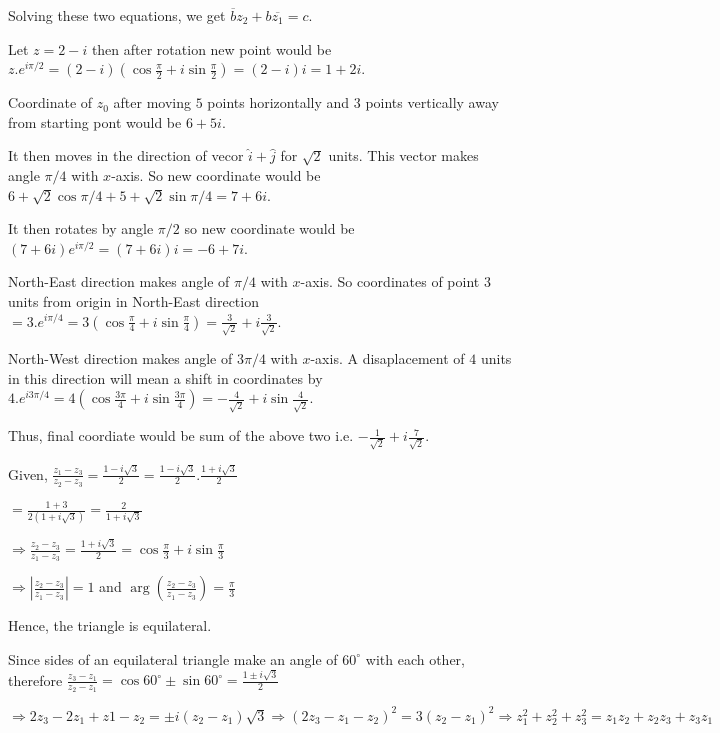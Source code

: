   Solving these two equations, we get $\overline{b}z_2 + b\overline{z_1} = c$.
\item   Let $z = 2 - i$ then after rotation new point would be $z.e^{i\pi/2} = (2 - i)\left(\cos\frac{\pi}{2} +
  i\sin\frac{\pi}{2}\right) = (2 - i)i = 1 + 2i$.
\item Coordinate of $z_0$ after moving $5$ points horizontally and $3$ points vertically away from starting pont would be
  $6 + 5i$.

  It then moves in the direction of vecor $\hat{i} + \hat{j}$ for $\sqrt{2}$ units. This vector makes angle $\pi/4$ with
  $x$-axis. So new coordinate would be $6 + \sqrt{2}\cos\pi/4 + 5 + \sqrt{2}\sin\pi/4 = 7 + 6i$.

  It then rotates by angle $\pi/2$ so new coordinate would be $(7 + 6i)e^{i\pi/2} = (7 + 6i)i = -6 + 7i$.
\item North-East direction makes angle of $\pi/4$ with $x$-axis. So coordinates of point $3$ units from origin in
  North-East direction $= 3.e^{i\pi/4} = 3\left(\cos\frac{\pi}{4} + i\sin\frac{\pi}{4}\right) = \frac{3}{\sqrt{2}} +
  i\frac{3}{\sqrt{2}}$.

  North-West direction makes angle of $3\pi/4$ with $x$-axis. A disaplacement of $4$ units in this direction will mean a shift in
  coordinates by $4.e^{i3\pi/4} = 4\left(\cos\frac{3\pi}{4} + i\sin\frac{3\pi}{4}\right) = -\frac{4}{\sqrt{2}} +
  i\sin\frac{4}{\sqrt{2}}$.

  Thus, final coordiate would be sum of the above two i.e. $-\frac{1}{\sqrt{2}} + i\frac{7}{\sqrt{2}}$.
\item Given, $\frac{z_1 - z_3}{z_2 - z_3} = \frac{1 - i\sqrt{3}}{2} = \frac{1 - i\sqrt{3}}{2}.\frac{1 +
    i\sqrt{3}}{2}$

  $= \frac{1 + 3}{2(1 + i\sqrt{3})}= \frac{2}{1 + i\sqrt{3}}$

  $\Rightarrow \frac{z_2 - z_3}{z_1 - z_3} = \frac{1 + i\sqrt{3}}{2} = \cos\frac{\pi}{3} + i\sin\frac{\pi}{3}$

  $\Rightarrow \left|\frac{z_2 - z_3}{z_1 - z_3}\right| = 1$ and $\arg\left(\frac{z_2 - z_3}{z_1 -
  z_3}\right) = \frac{\pi}{3}$

  Hence, the triangle is equilateral.
\item Since sides of an equilateral triangle make an angle of $60^\circ$ with each other, therefore
  $\frac{z_3 - z_1}{z_2 - z_1} = \cos60^\circ \pm \sin60^\circ = \frac{1 \pm i\sqrt{3}}{2}$

  $\Rightarrow 2z_3 - 2z_1 + z1 - z_2 = \pm i(z_2 - z_1)\sqrt{3}\Rightarrow (2z_3 - z_1 - z_2)^2 = 3(z_2 -
  z_1)^2\Rightarrow z_1^2 + z_2^2 + z_3^2 = z_1z_2 + z_2z_3 +z_3z_1$

